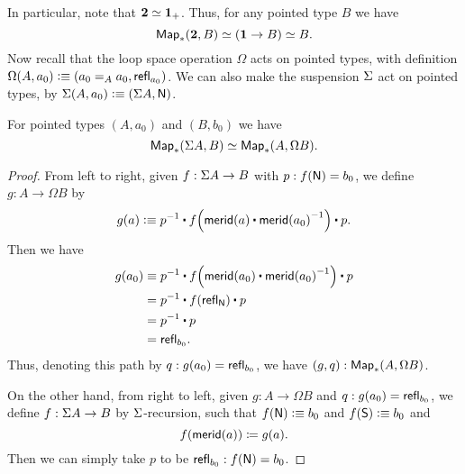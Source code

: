In particular, note that $\eqv{\bool}{\unit_+}$.
Thus, for any pointed type $B$ we have
\[{\Map_*(\bool,B)} \eqvsym {(\unit \to B)}\eqvsym B.\]
%
Now recall that the loop space operation $\Omega$ acts on pointed types, with definition $\Omega(A,a_0) \defeq (\id[A]{a_0}{a_0},\refl{a_0})$.
We can also make the suspension $\susp$ act on pointed types, by $\susp(A,a_0)\defeq (\susp A,\north)$.

\begin{lem}\label{lem:susp-loop-adj}
  For pointed types $(A,a_0)$ and $(B,b_0)$ we have
  \[ \eqv{\Map_*(\susp A, B)}{\Map_*(A,\Omega B)}.\]
\end{lem}
\begin{proof}
  From left to right, given $f:\susp A \to B$ with $p:f(\north) = b_0$, we define $g:A \to \Omega B$ by
  \[g(a) \defeq \opp p \ct \ap f{\merid(a) \ct \opp{\merid(a_0)}} \ct p.\]
  Then we have
  \begin{align*}
    g(a_0) &\jdeq \opp p \ct \ap f{\merid(a_0) \ct \opp{\merid(a_0)}} \ct p\\
    &= \opp p \ct \ap f{\refl{\north}} \ct p\\
    &= \opp p \ct p\\
    &= \refl{b_0}.
  \end{align*}
  Thus, denoting this path by $q:g(a_0)=\refl{b_0}$, we have $(g,q):\Map_*(A,\Omega B)$.

  On the other hand, from right to left, given $g:A\to \Omega B$ and $q:g(a_0)=\refl{b_0}$, we define $f:\susp A \to B$ by $\susp$-recursion, such that $f(\north)\defeq b_0$ and $f(\south)\defeq b_0$ and
  \[ \ap f {\merid(a)} \defid g(a). \]
  Then we can simply take $p$ to be $\refl{b_0} : f(\north)= b_0$.


\end{proof}
